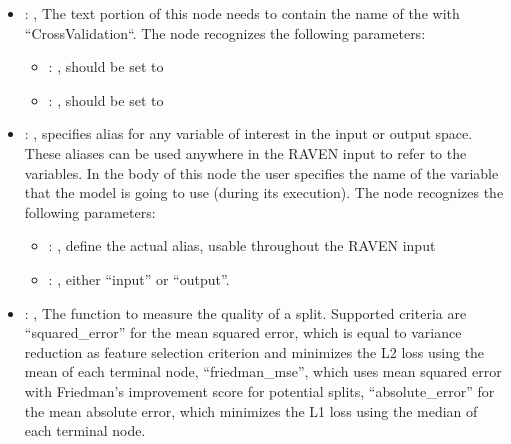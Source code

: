 \begin{itemize}
\begin{itemize}
        \item {}: ,
          List of IDs of features/variables to include in the transformation process.

        \item {}: ,
          Which space to search? Target or Feature?
      \end{itemize}

    \item {}: ,
      The text portion of this node needs to contain the name of the  with
               ``CrossValidation``.
      The  node recognizes the following parameters:
        \begin{itemize}
          \item {}: ,
            should be set to 
          \item {}: ,
            should be set to 
      \end{itemize}

    \item {}: ,
      specifies alias for         any variable of interest in the input or output space. These
      aliases can be used anywhere in the RAVEN input to         refer to the variables. In the body
      of this node the user specifies the name of the variable that the model is going to use
      (during its execution).
      The  node recognizes the following parameters:
        \begin{itemize}
          \item {}: ,
            define the actual alias, usable throughout the RAVEN input
          \item {}: ,
            either ``input'' or ``output''.
      \end{itemize}

    \item {}: ,
      The function to measure the quality of a split. Supported criteria are ``squared\_error'' for
      the mean squared error,                                                  which is equal to
      variance reduction as feature selection criterion and minimizes the L2 loss using the mean of
      each                                                  terminal node, ``friedman\_mse'', which
      uses mean squared error with Friedman's improvement score for potential splits,
      ``absolute\_error'' for the mean absolute error, which minimizes the L1 loss using the median
      of each terminal node.


\end{itemize}
